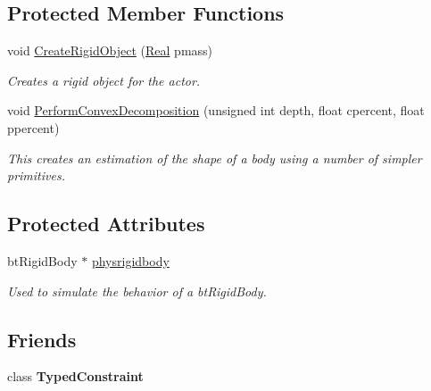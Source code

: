 \subsection*{Protected Member Functions}
\begin{DoxyCompactItemize}
\item 
void \hyperlink{classphys_1_1ActorRigid_a19227c52b972cd96ad69a7b6273e2bbf}{CreateRigidObject} (\hyperlink{namespacephys_af7eb897198d265b8e868f45240230d5f}{Real} pmass)
\begin{DoxyCompactList}\small\item\em Creates a rigid object for the actor. \item\end{DoxyCompactList}\item 
void \hyperlink{classphys_1_1ActorRigid_a63aac7ce099716928f7b9f4c6ef40453}{PerformConvexDecomposition} (unsigned int depth, float cpercent, float ppercent)
\begin{DoxyCompactList}\small\item\em This creates an estimation of the shape of a body using a number of simpler primitives. \item\end{DoxyCompactList}\end{DoxyCompactItemize}
\subsection*{Protected Attributes}
\begin{DoxyCompactItemize}
\item 
\hypertarget{classphys_1_1ActorRigid_a690889f942e177644f4f8521f509c88d}{
btRigidBody $\ast$ \hyperlink{classphys_1_1ActorRigid_a690889f942e177644f4f8521f509c88d}{physrigidbody}}
\label{d8/d71/classphys_1_1ActorRigid_a690889f942e177644f4f8521f509c88d}

\begin{DoxyCompactList}\small\item\em Used to simulate the behavior of a btRigidBody. \item\end{DoxyCompactList}\end{DoxyCompactItemize}
\subsection*{Friends}
\begin{DoxyCompactItemize}
\item 
\hypertarget{classphys_1_1ActorRigid_aefa96202ca25d6b82320520f2789b6cf}{
class {\bfseries TypedConstraint}}
\label{d8/d71/classphys_1_1ActorRigid_aefa96202ca25d6b82320520f2789b6cf}

\end{DoxyCompactItemize}



